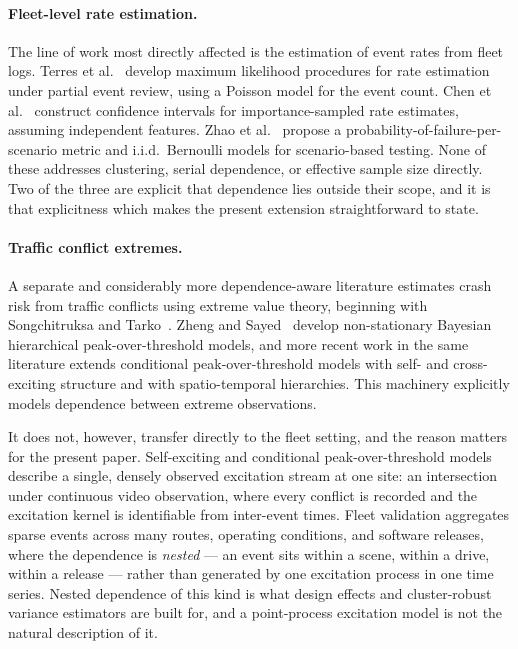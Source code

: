 \documentclass[11pt]{article}
\begin{document}
\paragraph{Fleet-level rate estimation.} The line of work most directly affected is
the estimation of event rates from fleet logs. Terres et
al.~\cite{terres2023behavioral} develop maximum likelihood procedures for rate
estimation under partial event review, using a Poisson model for the event count.
Chen et al.~\cite{chen2026confidence} construct confidence intervals for
importance-sampled rate estimates, assuming independent features. Zhao et
al.~\cite{zhao2025need} propose a probability-of-failure-per-scenario metric and
i.i.d.\ Bernoulli models for scenario-based testing. None of these addresses
clustering, serial dependence, or effective sample size directly. Two of the three
are explicit that dependence lies outside their scope, and it is that explicitness
which makes the present extension straightforward to state.

\paragraph{Traffic conflict extremes.} A separate and considerably more
dependence-aware literature estimates crash risk from traffic conflicts using
extreme value theory, beginning with Songchitruksa and
Tarko~\cite{songchitruksa2006extreme}. Zheng and Sayed~\cite{zheng2019bayesian}
develop non-stationary Bayesian hierarchical peak-over-threshold models, and more
recent work in the same literature extends conditional peak-over-threshold models
with self- and cross-exciting structure and with spatio-temporal hierarchies.
This machinery explicitly models dependence between extreme observations.

It does not, however, transfer directly to the fleet setting, and the reason
matters for the present paper. Self-exciting and conditional peak-over-threshold
models describe a single, densely observed excitation stream at one site: an
intersection under continuous video observation, where every conflict is recorded
and the excitation kernel is identifiable from inter-event times. Fleet validation
aggregates sparse events across many routes, operating conditions, and software
releases, where the dependence is \emph{nested} --- an event sits within a scene,
within a drive, within a release --- rather than generated by one excitation
process in one time series. Nested dependence of this kind is what design effects
and cluster-robust variance estimators are built for, and a point-process
excitation model is not the natural description of it.
\end{document}
